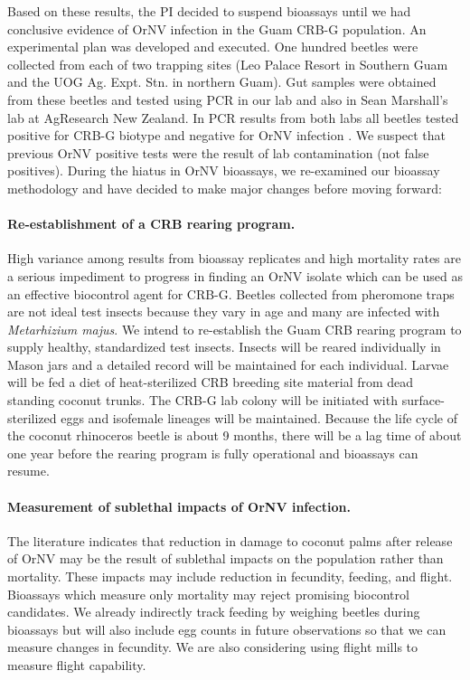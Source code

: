 \documentclass[12pt,letterpaper,english,bibliography=totocnumbered,abstract=on]{scrartcl}
\begin{document}
Based on these results, the PI decided to suspend bioassays until we had conclusive evidence of OrNV infection in the Guam CRB-G population. An experimental plan \cite{mooreExperimentalPlanDetermining2020} was
developed and executed. One hundred beetles were collected from each of two trapping sites
(Leo Palace Resort in Southern Guam and the UOG Ag. Expt. Stn. in northern Guam).
Gut samples were obtained from these beetles and tested using PCR in our lab and also in
Sean Marshall's lab at AgResearch New Zealand. In PCR results from both labs all beetles tested positive for CRB-G biotype and negative for OrNV infection \cite{graselaInvestigationDeterminePresence2020}. We suspect that
previous OrNV positive tests were the result of lab contamination (not false positives).
During the hiatus in OrNV bioassays, we re-examined our bioassay methodology and have
decided to make major changes before moving forward:

\paragraph{Re-establishment of a CRB rearing program.} High variance among results from bioassay
replicates and high mortality rates are a serious impediment to progress in finding an
OrNV isolate which can be used as an effective biocontrol agent for CRB-G. Beetles
collected from pheromone traps are not ideal test insects because they vary in age and
many are infected with \textit{Metarhizium majus}.
We intend to re-establish the Guam CRB rearing program to supply healthy, standardized test insects. Insects will be reared individually in Mason jars and a detailed record
will be maintained for each individual. Larvae will be fed a diet of heat-sterilized CRB
breeding site material from dead standing coconut trunks. The CRB-G lab colony will
be initiated with surface-sterilized eggs and isofemale lineages will be maintained.
Because the life cycle of the coconut rhinoceros beetle is about 9 months, there will
be a lag time of about one year before the rearing program is fully operational and bioassays can resume.

\paragraph{Measurement of sublethal impacts of OrNV infection.} The literature indicates
that reduction in damage to coconut palms after release of OrNV may be the result of
sublethal impacts on the population rather than mortality. These impacts may include
reduction in fecundity, feeding, and flight. Bioassays which measure only mortality may
reject promising biocontrol candidates.
We already indirectly track feeding by weighing beetles during bioassays but will also
include egg counts in future observations so that we can measure changes in fecundity. We are also considering using flight mills to measure flight capability.
\end{document}

